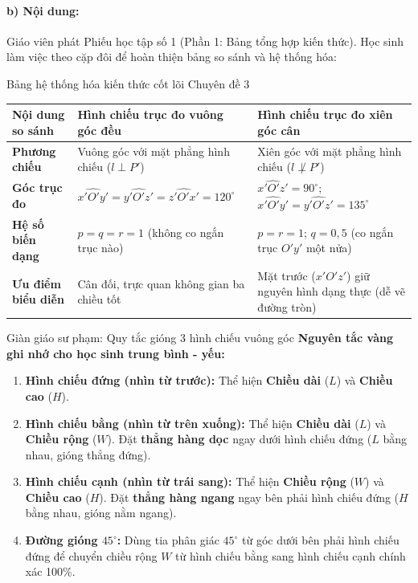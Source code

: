 \documentclass[12pt, a4paper]{article}
\begin{document}
\paragraph{b) Nội dung:} Giáo viên phát Phiếu học tập số 1 (Phần 1: Bảng tổng hợp kiến thức). Học sinh làm việc theo cặp đôi để hoàn thiện bảng so sánh và hệ thống hóa:

\begin{pedabox}{Bảng hệ thống hóa kiến thức cốt lõi Chuyên đề 3}
\begin{center}
\small
\begin{tabularx}{\linewidth}{|l|X|X|}
\hline
\textbf{Nội dung so sánh} & \textbf{Hình chiếu trục đo vuông góc đều} & \textbf{Hình chiếu trục đo xiên góc cân} \\ \hline
\textbf{Phương chiếu} & Vuông góc với mặt phẳng hình chiếu ($l \perp P'$) & Xiên góc với mặt phẳng hình chiếu ($l \not\perp P'$) \\ \hline
\textbf{Góc trục đo} & $\widehat{x'O'y'} = \widehat{y'O'z'} = \widehat{z'O'x'} = 120^\circ$ & $\widehat{x'O'z'} = 90^\circ$; $\widehat{x'O'y'} = \widehat{y'O'z'} = 135^\circ$ \\ \hline
\textbf{Hệ số biến dạng} & $p = q = r = 1$ (không co ngắn trục nào) & $p = r = 1$; $q = 0{,}5$ (co ngắn trục $O'y'$ một nửa) \\ \hline
\textbf{Ưu điểm biểu diễn} & Cân đối, trực quan không gian ba chiều tốt & Mặt trước ($x'O'z'$) giữ nguyên hình dạng thực (dễ vẽ đường tròn) \\ \hline
\end{tabularx}
\end{center}
\end{pedabox}

\begin{scaffoldbox}{Giàn giáo sư phạm: Quy tắc gióng 3 hình chiếu vuông góc}
\textbf{Nguyên tắc vàng ghi nhớ cho học sinh trung bình - yếu:}
\begin{enumerate}[leftmargin=0.6cm]
    \item \textbf{Hình chiếu đứng (nhìn từ trước):} Thể hiện \textbf{Chiều dài} ($L$) và \textbf{Chiều cao} ($H$).
    \item \textbf{Hình chiếu bằng (nhìn từ trên xuống):} Thể hiện \textbf{Chiều dài} ($L$) và \textbf{Chiều rộng} ($W$). Đặt \textbf{thẳng hàng dọc} ngay dưới hình chiếu đứng ($L$ bằng nhau, gióng thẳng đứng).
    \item \textbf{Hình chiếu cạnh (nhìn từ trái sang):} Thể hiện \textbf{Chiều rộng} ($W$) và \textbf{Chiều cao} ($H$). Đặt \textbf{thẳng hàng ngang} ngay bên phải hình chiếu đứng ($H$ bằng nhau, gióng nằm ngang).
    \item \textbf{Đường gióng $45^\circ$:} Dùng tia phân giác $45^\circ$ từ góc dưới bên phải hình chiếu đứng để chuyển chiều rộng $W$ từ hình chiếu bằng sang hình chiếu cạnh chính xác 100\%.
\end{enumerate}
\end{scaffoldbox}
\end{document}
